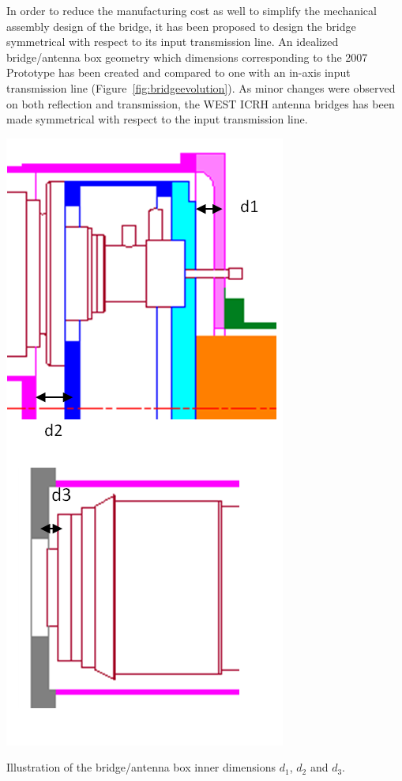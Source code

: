 {In order to reduce the manufacturing cost as well to simplify the mechanical assembly design of the bridge, it has been proposed to design the bridge symmetrical with respect to its input transmission line. An idealized bridge/antenna box geometry which dimensions corresponding to the 2007 Prototype has been created and compared to one with an in-axis input transmission line (Figure~\ref{fig:bridgeevolution}). As minor changes were observed on both reflection and transmission, the WEST ICRH antenna bridges has been made symmetrical with respect to the input transmission line.

\begin{marginfigure}
	\centering
	\includegraphics[width=0.8\linewidth]{figures/chap3/WEST_ICRH/bridge_evolution2}
	\caption{Illustration of the bridge/antenna box inner dimensions $d_1$, $d_2$ and $d_3$.}
	\label{fig:bridgeevolution2}
\end{marginfigure}

}
